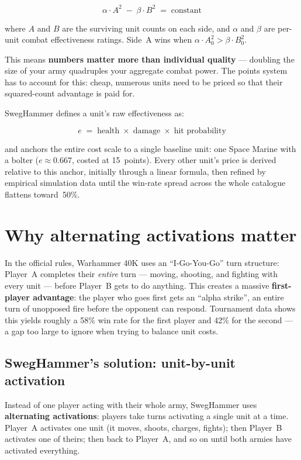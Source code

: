 \documentclass[11pt,a4paper]{article}
\begin{document}
\[
  \alpha \cdot A^2 \;-\; \beta \cdot B^2 \;=\; \text{constant}
\]

where $A$ and $B$ are the surviving unit counts on each side, and $\alpha$
and $\beta$ are per-unit combat effectiveness ratings. Side~A wins when
$\alpha \cdot A_0^2 > \beta \cdot B_0^2$.

This means \textbf{numbers matter more than individual quality} --- doubling
the size of your army quadruples your aggregate combat power. The points
system has to account for this: cheap, numerous units need to be priced so
that their squared-count advantage is paid for.

SwegHammer defines a unit's raw effectiveness as:

\[
  e \;=\; \text{health} \;\times\; \text{damage} \;\times\; \text{hit probability}
\]

and anchors the entire cost scale to a single baseline unit: one Space
Marine with a bolter (\mbox{$e \approx 0.667$}, costed at 15~points). Every
other unit's price is derived relative to this anchor, initially through a
linear formula, then refined by empirical simulation data until the win-rate
spread across the whole catalogue flattens toward~50\%.

\section{Why alternating activations matter}

In the official rules, Warhammer 40K uses an ``I-Go-You-Go'' turn
structure: Player~A completes their \textit{entire} turn --- moving,
shooting, and fighting with every unit --- before Player~B gets to do
anything. This creates a massive \textbf{first-player advantage}: the player
who goes first gets an ``alpha strike'', an entire turn of unopposed fire
before the opponent can respond. Tournament data shows this yields roughly a
58\% win rate for the first player and 42\% for the second --- a gap too
large to ignore when trying to balance unit costs.

\subsection{SwegHammer's solution: unit-by-unit activation}

Instead of one player acting with their whole army, SwegHammer uses
\textbf{alternating activations}: players take turns activating a single
unit at a time. Player~A activates one unit (it moves, shoots, charges,
fights); then Player~B activates one of theirs; then back to Player~A, and
so on until both armies have activated everything.
\end{document}

